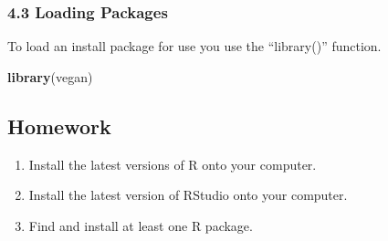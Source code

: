 \documentclass[
]{article}
\newenvironment{Shaded}{\begin{snugshade}}{\end{snugshade}}
\newcommand{\FunctionTok}[1]{\textcolor[rgb]{0.13,0.29,0.53}{\textbf{#1}}}
\newcommand{\NormalTok}[1]{#1}
\providecommand{\tightlist}{%
  \setlength{\itemsep}{0pt}\setlength{\parskip}{0pt}}
\begin{document}
\subsubsection{4.3 Loading Packages}\label{loading-packages}

To load an install package for use you use the ``library()'' function.

\begin{Shaded}
\begin{Highlighting}[]
\FunctionTok{library}\NormalTok{(vegan)}
\end{Highlighting}
\end{Shaded}

\subsection{Homework}\label{homework}

\begin{enumerate}
\def\labelenumi{\arabic{enumi}.}
\tightlist
\item
  Install the latest versions of R onto your computer.
\item
  Install the latest version of RStudio onto your computer.
\item
  Find and install at least one R package.
\end{enumerate}
\end{document}

